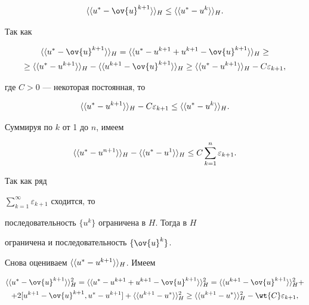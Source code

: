 $$


\la\la u^*-\ov{u}^{k+1}\ra\ra _H\le \la\la u^*-u^k\ra\ra_H.


$$


Так как


\begin{multline*}


\la\la u^*-\ov{u}^{k+1}\ra\ra _H=\la\la u^*-u^{k+1}+u^{k+1}-


\ov{u}^{k+1}\ra\ra_H\ge \\


%


\ge \la\la u^*-u^{k+1}\ra\ra _H-\la\la u^{k+1}-\ov{u}^{k+1}\ra\ra_H


\ge \la\la u^*-u^{k+1}\ra\ra _H-C\varepsilon_{k+1},


\end{multline*}


где $C>0$ --- некоторая постоянная, то


\begin{equation}\label{5}


\la\la u^*-u^{k+1}\ra\ra _H-C\varepsilon_{k+1}\le \la\la u^*-u^{k}\ra\ra _H.


\end{equation}


Суммируя по $k$ от 1 до $n$, имеем


$$


\la\la u^*-u^{n+1}\ra\ra _H-\la\la u^*-u^{1}\ra\ra _H\le


C\sum\limits_{k=1}^n\varepsilon_{k+1}.


$$


Так как ряд


$\sum\limits_{k=1}^\infty\varepsilon_{k+1}$ сходится, то


последовательность $\{u^k\}$ ограничена в $H$. Тогда в $H$


ограничена и последовательность $\{\ov{u}^k\}$.





Снова оцениваем $\langle\langle u^*-u^{k+1}\rangle\rangle _H$. Имеем


\begin{multline*}


\la\la u^*-\ov{u}^{k+1}\ra\ra ^2_H=\la\la u^*-u^{k+1}+


u^{k+1}-\ov{u}^{k+1}\ra\ra^2_H=\la\la u^{k+1}-\ov{u}^{k+1}\ra\ra^2_H+ \\


%


+2[u^{k+1}-\ov{u}^{k+1},u^{*}-{u}^{k+1}]+ \la\la


u^{k+1}-{u}^{*}\ra\ra ^2_H\ge\la\la u^{k+1}-{u}^{*}\ra\ra


^2_H-\wt{C}\varepsilon_{k+1},


\end{multline*}


